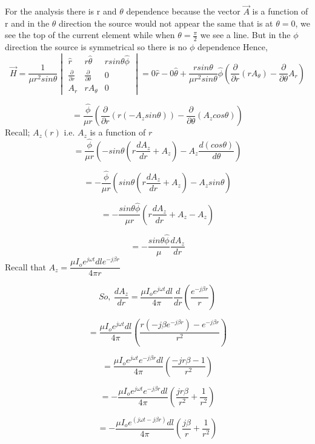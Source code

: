 	For the analysis there is r and $\theta$ dependence because the vector $\vec{A}$ is a function of r and in the $\theta$ direction the source would not appear the same that is at $\theta = 0$, we see the top of the current element while when $\theta = \frac{\pi}{2}$ we see a line. But in the $\phi$ direction the source is symmetrical so there is no $\phi$ dependence 
	Hence, 
	\begin{dmath*}
	\vec {H} = \dfrac{1}{\mu r^2 sin\theta} \begin{vmatrix}
	\hat{r} & r\hat{\theta} & rsin\theta\hat{\phi} \\
	\frac{\partial }{\partial r} &  \frac{\partial }{\partial \theta} &  0 \\
	A_r & rA_{\theta} & 0
	\end{vmatrix} = 0 \hat{r} - 0\hat{\theta} + \dfrac{rsin\theta}{\mu r^2 sin\theta}\hat{\phi}\left( \dfrac{\partial }{\partial r}(rA_{\theta}) - \dfrac{\partial }{\partial \theta} A_r\right)
	\end{dmath*}
	
	$$ = \dfrac{\hat{\phi}}{\mu r}\left(\dfrac{\partial}{\partial r}(r(-A_z sin\theta)) - \dfrac{\partial}{\partial \theta}(A_z cos\theta)\right)$$ 
	Recall; $A_z(r)$ i.e. $A_z$ is a function of $r$
	$$ = \dfrac{\hat{\phi}}{\mu r} \left(-sin\theta\left(r\dfrac{dA_z}{dr} + A_z\right) - A_z \dfrac{d(cos\theta)}{d\theta}\right)$$
	
	$$ = -\dfrac{\hat{\phi}}{\mu r} (sin\theta\left(r\dfrac{dA_z}{dr} + A_z\right) - A_zsin\theta)$$
	
	$$ = -\dfrac{sin\theta\hat{\phi}}{\mu r} \left(r\dfrac{dA_z}{dr} + A_z - A_z\right)$$
	
	$$ = -\dfrac{sin\theta\hat{\phi}}{\mu } \dfrac{dA_z}{dr}$$ 
	Recall that $A_z = \dfrac{\mu I_o e^{j\omega t} dl e^{-j\beta r}}{4\pi r}$
	
	$$So, \ \dfrac{dA_z}{dr} = \dfrac{\mu I_o e^{j\omega t} dl}{4\pi}\dfrac{d}{dr}\left(\dfrac{e^{-j\beta r}}{r}\right)$$
	
	$$ = \dfrac{\mu I_o e^{j\omega t} dl}{4\pi} \left(\dfrac{r(-j\beta e^{-j\beta r}) - e^{-j\beta r}}{r^2}\right)$$
	
	$$ = \dfrac{\mu I_o e^{j\omega t}e^{-j\beta r} dl}{4\pi}  \left(\dfrac{-jr\beta - 1}{r^2}\right)$$
	
	$$ = - \dfrac{\mu I_o e^{j\omega t}e^{-j\beta r} dl}{4\pi} \left(\dfrac{jr\beta}{r^2} + \dfrac{1}{r^2}\right)$$
	
	$$ = - \dfrac{\mu I_o e^{(j\omega t-j\beta r)} dl}{4\pi} \left(\dfrac{j\beta}{r} + \dfrac{1}{r^2}\right)$$
	
